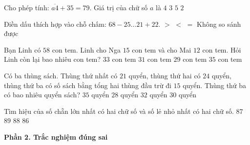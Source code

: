 \begin{ex} %
Cho phép tính: $\overline{a4} + 35 = 79$. Giá trị của chữ số $a$ là
\choice
{\True $4$}
{$3$}
{$5$}
{$2$}
\end{ex}

\begin{ex} %
Điền dấu thích hợp vào chỗ chấm: $68 - 25 \dots 21 + 22$.
\choice
{$>$}
{$<$}
{\True $=$}
{Không so sánh được}
\end{ex}

\begin{ex} %
Bạn Linh có $58$ con tem. Linh cho Nga $15$ con tem và cho Mai $12$ con tem. Hỏi Linh còn lại bao nhiêu con tem?
\choice
{$33$ con tem}
{\True $31$ con tem}
{$29$ con tem}
{$35$ con tem}
\end{ex}

\begin{ex} %
Có ba thùng sách. Thùng thứ nhất có $21$ quyển, thùng thứ hai có $24$ quyển, thùng thứ ba có số sách bằng tổng hai thùng đầu trừ đi $15$ quyển. Thùng thứ ba có bao nhiêu quyển sách?
\choice
{$35$ quyển}
{$28$ quyển}
{$32$ quyển}
{\True $30$ quyển}
\end{ex}

\begin{ex} %
Tìm hiệu của số chẵn lớn nhất có hai chữ số và số lẻ nhỏ nhất có hai chữ số.
\choice
{\True $87$}
{$89$}
{$88$}
{$86$}
\end{ex}

\textbf{Phần 2. Trắc nghiệm đúng sai}

